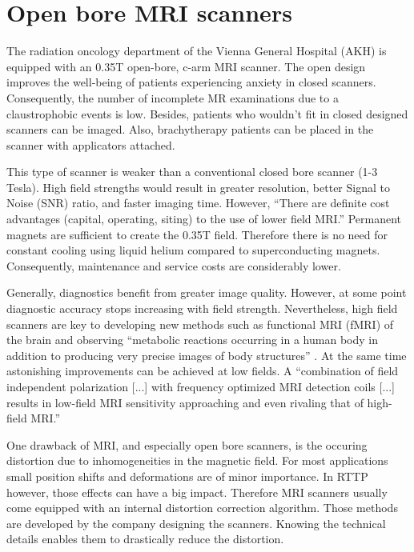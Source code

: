 \section{Open bore MRI scanners}

The radiation oncology department of the Vienna General Hospital (AKH) is equipped with an 0.35T open-bore, c-arm MRI scanner. The open design improves the well-being of patients
experiencing anxiety in closed scanners. Consequently, the number of incomplete MR examinations due to a claustrophobic events is low. \cite{Enders2011a, Bangard2007}
Besides, patients who wouldn't fit in closed designed scanners can be imaged.
Also, brachytherapy patients can be placed in the scanner with applicators attached.

This type of scanner is weaker than a conventional closed bore scanner (1-3 Tesla). High field strengths would result in greater resolution, better Signal to Noise (SNR) ratio, and faster imaging time.
However, ``There are definite cost advantages (capital, operating, siting) to the use of lower field MRI.'' \cite{Rutt1996}
Permanent magnets are sufficient to create the 0.35T field. Therefore there is no need for constant cooling using liquid helium compared to superconducting magnets.
Consequently, maintenance and service costs are considerably lower.

Generally, diagnostics benefit from greater image quality. However, at some point diagnostic accuracy stops increasing with field strength.
Nevertheless, high field scanners are key to developing new methods such as functional MRI (fMRI) of the brain \cite{Duyn2012} and observing
``metabolic reactions occurring in a human body in addition to producing very precise images of body structures'' \cite{Wada2010}.
At the same time astonishing improvements can be achieved at low fields.
A ``combination of field independent polarization [...] with frequency optimized MRI detection coils [...] results in low-field MRI sensitivity approaching and even rivaling that of high-field MRI.'' \cite{Coffey2013}

One drawback of MRI, and especially open bore scanners, is the occuring distortion due to inhomogeneities in the magnetic field.
For most applications small position shifts and deformations are of minor importance. In RTTP however, those effects can have a big impact.
Therefore MRI scanners usually come equipped with an internal distortion correction algorithm.
Those methods are developed by the company designing the scanners. Knowing the technical details enables them to drastically reduce the distortion.

